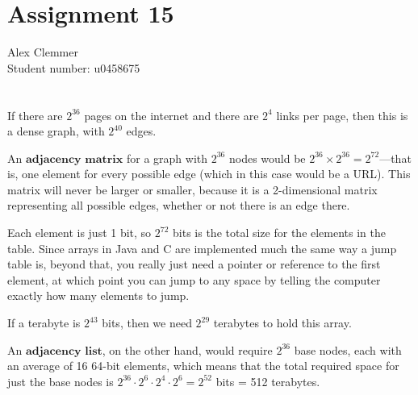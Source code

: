 \documentclass[a4paper]{article}
\begin{document}
\section*{Assignment 15}
Alex Clemmer\\
Student number: u0458675

\section{}

If there are $2^{36}$ pages on the internet and there are $2^4$ links per page, then this is a dense graph, with $2^{40}$ edges.

An $\textbf{adjacency matrix}$ for a graph with $2^{36}$ nodes would be $2^{36} \times 2^{36} = 2^{72}$---that is, one element for every possible edge (which in this case would be a URL). This matrix will never be larger or smaller, because it is a 2-dimensional matrix representing all possible edges, whether or not there is an edge there.

Each element is just 1 bit, so $2^{72}$ bits is the total size for the elements in the table. Since arrays in Java and C are implemented much the same way a jump table is, beyond that, you really just need a pointer or reference to the first element, at which point you can jump to any space by telling the computer exactly how many elements to jump.

If a terabyte is $2^{43}$ bits, then we need $2^{29}$ terabytes to hold this array.

An $\textbf{adjacency list}$, on the other hand, would require $2^{36}$ base nodes, each with an average of 16 64-bit elements, which means that the total required space for just the base nodes is $2^{36} \cdot 2^6 \cdot 2^4 \cdot 2^{6} = 2^{52}$ bits = 512 terabytes.
\end{document}
